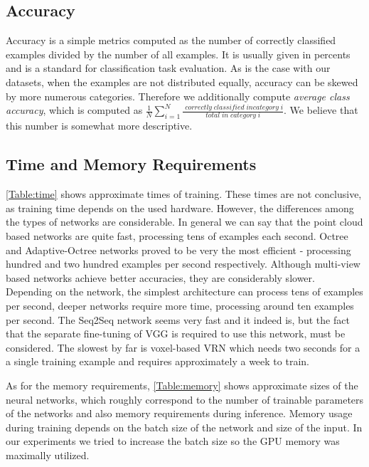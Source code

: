 \subsection{Accuracy}
Accuracy is a simple metrics computed as the number of correctly classified examples divided by the number of all examples. It is usually given in percents and is a standard for classification task evaluation. As is the case with our datasets, when the examples are not distributed equally, accuracy can be skewed by more numerous categories. Therefore we additionally compute \textit{average class accuracy}, which is computed as $\frac{1}{N}\sum_{i=1}^{N} {\frac{\;correctly\;classified\;in category\;i}{total\;in\;category\;i}} $. We believe that this number is somewhat more descriptive. 

\subsection{Time and Memory Requirements}
\autoref{Table:time} shows approximate times of training. These times are not conclusive, as training time depends on the used hardware. However, the differences among the types of networks are considerable. In general we can say that the point cloud based networks are quite fast, processing tens of examples each second. Octree and Adaptive-Octree networks proved to be very the most efficient - processing hundred and two hundred examples per second respectively. Although multi-view based networks achieve better accuracies, they are considerably slower. Depending on the network, the simplest architecture can process tens of examples per second, deeper networks require more time, processing around ten examples per second. The Seq2Seq network seems very fast and it indeed is, but the fact that the separate fine-tuning of VGG is required to use this network, must be considered. The slowest by far is voxel-based VRN which needs two seconds for a a single training example and requires approximately a week to train. \par

As for the memory requirements, \autoref{Table:memory} shows approximate sizes of the neural networks, which roughly correspond to the number of trainable parameters of the networks and also memory requirements during inference. Memory usage during training depends on the batch size of the network and size of the input. In our experiments we tried to increase the batch size so the GPU memory was maximally utilized. 


